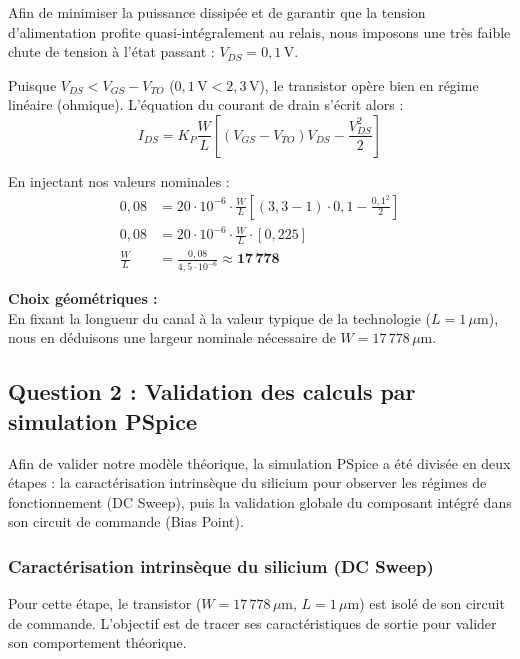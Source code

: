 \documentclass[11pt,a4paper]{article}
\begin{document}
Afin de minimiser la puissance dissipée et de garantir que la tension d'alimentation profite quasi-intégralement au relais, nous imposons une très faible chute de tension à l'état passant : \textbf{$V_{DS} = 0,1\,\text{V}$}. 

Puisque $V_{DS} < V_{GS} - V_{TO}$ ($0,1\,\text{V} < 2,3\,\text{V}$), le transistor opère bien en régime linéaire (ohmique). L'équation du courant de drain s'écrit alors :
\begin{equation}
    I_{DS} = K_P \frac{W}{L} \left[ (V_{GS} - V_{TO})V_{DS} - \frac{V_{DS}^2}{2} \right]
\end{equation}

En injectant nos valeurs nominales :
\begin{align*}
    0{,}08 &= 20 \cdot 10^{-6} \cdot \frac{W}{L} \left[ (3{,}3 - 1) \cdot 0{,}1 - \frac{0{,}1^2}{2} \right] \\
    0{,}08 &= 20 \cdot 10^{-6} \cdot \frac{W}{L} \cdot [0{,}225] \\
    \frac{W}{L} &= \frac{0{,}08}{4{,}5 \cdot 10^{-6}} \approx \mathbf{17\,778}
\end{align*}

\vspace{0.5em}
\noindent\textbf{Choix géométriques :} \\
En fixant la longueur du canal à la valeur typique de la technologie (\textbf{$L = 1\,\mu\text{m}$}), nous en déduisons une largeur nominale nécessaire de \textbf{$W = 17\,778\,\mu\text{m}$}.

\subsection{Question 2 : Validation des calculs par simulation PSpice}

Afin de valider notre modèle théorique, la simulation PSpice a été divisée en deux étapes : la caractérisation intrinsèque du silicium pour observer les régimes de fonctionnement (DC Sweep), puis la validation globale du composant intégré dans son circuit de commande (Bias Point).

\subsubsection{Caractérisation intrinsèque du silicium (DC Sweep)}

Pour cette étape, le transistor ($W = 17\,778\,\mu\text{m}$, $L = 1\,\mu\text{m}$) est isolé de son circuit de commande. L'objectif est de tracer ses caractéristiques de sortie pour valider son comportement théorique.
\end{document}
